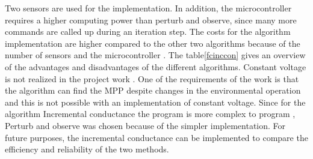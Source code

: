 Two sensors are used for the implementation. In addition, the microcontroller requires a higher computing power than perturb and observe, since many more commands are called up during an iteration step. The costs for the algorithm implementation are higher compared to the other two algorithms because of the number of sensors and the microcontroller . \newline
The table\ref{fcinccon} gives an overview of the advantages and disadvantages of the different algorithms.
%		
Constant voltage is not realized in the project work . One of the requirements of the work is that the algorithm can find the MPP despite changes in the environmental operation and this is not possible with an implementation of constant voltage. Since for the algorithm Incremental conductance the program is more complex to program , Perturb and observe was chosen because of the simpler implementation. For future purposes, the incremental conductance can be implemented to compare the efficiency and reliability of the two methods.


